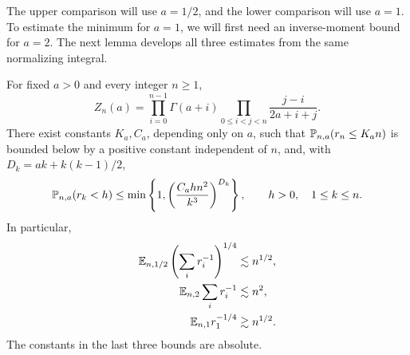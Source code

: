The upper comparison will use $a=1/2$, and the lower comparison will
use $a=1$. To estimate the minimum for $a=1$, we will first need an
inverse-moment bound for $a=2$. The next lemma develops all three
estimates from the same normalizing integral.

\begin{lemma}
\label{lem:laguerre}
For fixed $a>0$ and every integer $n\ge1$,
\begin{equation}\label{eq:01-normalizer}
 Z_n(a)=\prod_{i=0}^{n-1}\Gamma(a+i)
             \prod_{0\le i<j<n}\frac{j-i}{2a+i+j}.
\end{equation}
There exist constants $K_a,C_a$, depending only on $a$, such that
$\mathbb P_{n,a}(r_n\le K_an)$ is bounded below by a positive constant
independent of $n$, and, with $D_k=ak+k(k-1)/2$,
\begin{equation}\label{eq:01-small-coordinate}
 \mathbb P_{n,a}(r_k<h)
 \le\min\left\{1,\left(\frac{C_a h n^2}{k^3}\right)^{D_k}\right\},
 \qquad h>0,\quad 1\le k\le n.
\end{equation}
In particular,
\begin{align}
 \mathbb E_{n,1/2}\left(\sum_i r_i^{-1}\right)^{1/4}
       &\lesssim n^{1/2},\label{eq:01-reference-upper}\\
 \mathbb E_{n,2}\sum_i r_i^{-1}&\lesssim n^2,
       \label{eq:01-reference-inverse}\\
 \mathbb E_{n,1}r_1^{-1/4}&\gtrsim n^{1/2}.
       \label{eq:01-reference-lower}
\end{align}
The constants in the last three bounds are absolute.
\end{lemma}

